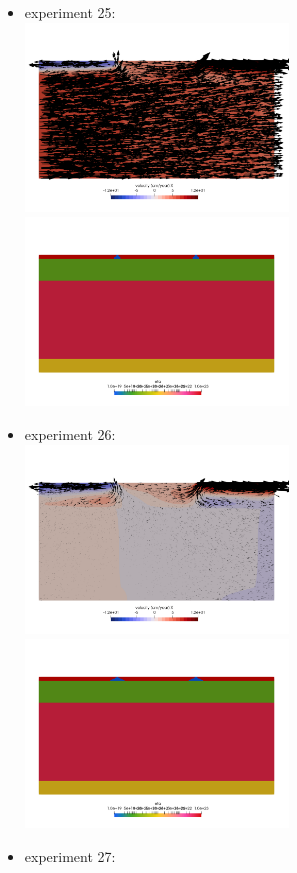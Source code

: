 \newpage
\begin{itemize}
\item experiment 25:\\
\includegraphics[width=7cm]{python_codes/fieldstone_148/results/vels_0024}
\includegraphics[width=7cm]{python_codes/fieldstone_148/results/etas_0024}
\item experiment 26:\\
\includegraphics[width=7cm]{python_codes/fieldstone_148/results/vels_0025}
\includegraphics[width=7cm]{python_codes/fieldstone_148/results/etas_0025}
\item experiment 27:\\

\end{itemize}
